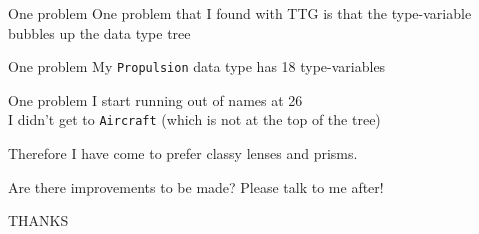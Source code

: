 \begin{frame}[fragile]
\begin{block}{One problem}
One problem that I found with TTG is that the type-variable bubbles up the data type tree
\end{block}
\end{frame}

\begin{frame}[fragile]
\begin{block}{One problem}
My \lstinline{Propulsion} data type has 18 type-variables
\end{block}
\end{frame}

\begin{frame}[fragile]
\begin{block}{One problem}
I start running out of names at 26
\\[13pt]
I didn't get to \lstinline{Aircraft} \tiny{(which is not at the top of the tree)}
\end{block}
\end{frame}

\begin{frame}[fragile]
\begin{block}{Therefore}
I have come to prefer classy lenses and prisms.
\end{block}
\end{frame}

\begin{frame}[fragile]
\begin{block}{}
Are there improvements to be made? Please talk to me after!
\end{block}
\end{frame}

\begin{frame}[fragile]
\begin{center}
THANKS
\end{center}
\end{frame}
